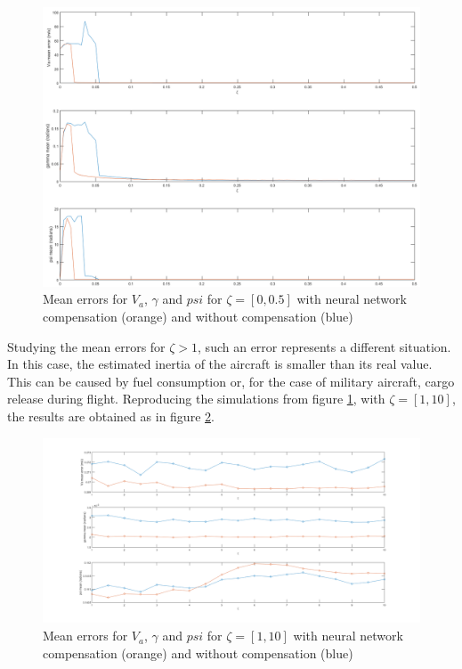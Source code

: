 \begin{figure}[h]
\centering
\includegraphics[width=1.1\textwidth]{Figures/Results/mean_error_xi.png}
\caption[Mean errors for $V_a$, $\gamma$ and $psi$]{Mean errors for $V_a$, $\gamma$ and $psi$ for $\zeta=[0,0.5]$ with neural network compensation (orange) and without compensation (blue)}
\label{fig:xi_mean_error}
\end{figure}

Studying the mean errors for $\zeta>1$, such an error represents a different situation. In this case, the estimated inertia of the aircraft is smaller than its real value. This can be caused by fuel consumption or, for the case of military aircraft, cargo release during flight. Reproducing the simulations from figure \ref{fig:xi_mean_error}, with $\zeta=[1,10]$, the results are obtained as in figure \ref{fig:xi_mean_error_big}.

\begin{figure}[H]
\centering
\includegraphics[width=1.2\textwidth]{Figures/Results/mean_error_xi_big.png}
\caption[Mean errors for $V_a$, $\gamma$ and $psi$ for larger values of $\zeta$ ]{Mean errors for $V_a$, $\gamma$ and $psi$ for $\zeta=[1,10]$ with neural network compensation (orange) and without compensation (blue)}
\label{fig:xi_mean_error_big}
\end{figure}

